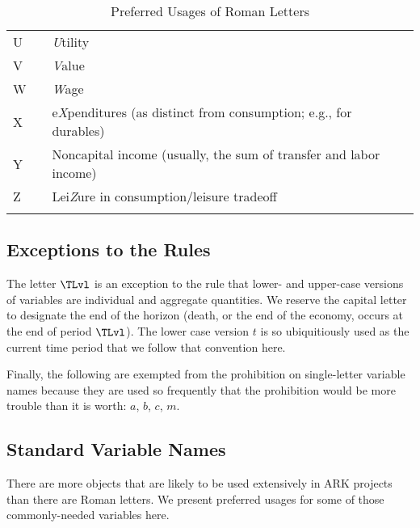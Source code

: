 \documentclass{econark}
\begin{document}
\begin{table}[ht]
\begin{tabular}{|lcl|}
    U & & \textit{U}tility\\
    V & & \textit{V}alue\\
    W & & \textit{W}age\\
    X & & e\textit{X}penditures (as distinct from consumption; e.g., for durables)\\
    Y & & Noncapital income (usually, the sum of transfer and labor income)\\
    Z & & Lei\textit{Z}ure in consumption/leisure tradeoff\\
  \\ \hline
  \end{tabular}
  \caption{Preferred Usages of Roman Letters}
  \label{table:RomanLetters}
\end{table}

\subsection{Exceptions to the Rules}

The letter $\TLvl$ is an exception to the rule that lower- and upper-case versions of variables are individual and aggregate quantities.  We reserve the capital letter to designate the end of the horizon (death, or the end of the economy, occurs at the end of period $\TLvl$).  The lower case version $t$ is so ubiquitiously used as the current time period that we follow that convention here.

Finally, the following are exempted from the prohibition on single-letter variable names because they are used so frequently that the prohibition would be more trouble than it is worth: $a$, $b$, $c$, $m$.

\pagebreak

\subsection{Standard Variable Names}

There are more objects that are likely to be used extensively in ARK projects than there are Roman letters.  We present preferred usages for some of those commonly-needed variables here.
\end{document}
